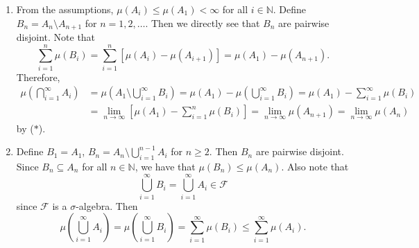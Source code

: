 \documentclass[12pt]{report}
\newcommand{\numl}[1]{\item[\large\textbf{\sffamily #1.}]}
\newcommand{\mc}[1]{\mathcal{#1}}
\newcommand{\bs}{\setminus}
\renewcommand{\subset}{\subseteq}
\newcommand{\paren}[1]{\left( #1 \right)}
\newcommand{\ra}{\rightarrow}
\newcommand{\mast}{\(\ast\)}
\newcommand{\N}{\mathbb{N}}
\begin{document}
\begin{enumerate}
    \numl{5} From the assumptions, \(\mu(A_i) \leq \mu(A_1) < \infty\) for all \(i \in \N\). Define \(B_n = A_n \bs A_{n+1}\) for \(n = 1, 2, \dots\). Then we directly see that \(B_n\) are pairwise disjoint. Note that
    \[ \tag{\mast}
        \sum_{i=1}^n \mu(B_i) = \sum_{i=1}^n \left[\mu(A_i) - \mu(A_{i+1})\right] = \mu(A_1) - \mu(A_{n+1}).
    \]
    Therefore,
    \[
        \begin{aligned}
            \mu\paren{\bigcap_{i=1}^\infty A_i} & = \mu\paren{A_1 \bs \bigcup_{i=1}^\infty B_i} = \mu(A_1) - \mu\paren{\bigcup_{i=1}^\infty B_i} = \mu(A_1) - \sum_{i=1}^\infty \mu(B_i) \\
                                                & =\lim_{n\ra\infty} \left[\mu(A_1) - \sum_{i=1}^n \mu(B_i)\right] = \lim_{n\ra \infty} \mu(A_{n+1}) = \lim_{n\ra \infty} \mu(A_{n})
        \end{aligned}
    \]
    by (\mast).

    \numl{6} Define \(B_1 = A_1\), \(B_n = A_n \bs \bigcup_{i=1}^{n-1} A_i\) for \(n \geq 2\). Then \(B_n\) are pairwise disjoint. Since \(B_n \subset A_n\) for all \(n \in \N\), we have that \(\mu(B_n) \leq \mu(A_n)\). Also note that
    \[
        \bigcup_{i=1}^\infty B_i = \bigcup_{i=1}^\infty A_i \in \mc{F}
    \]
    since \(\mc{F}\) is a \(\sigma\)-algebra. Then
    \[
        \mu\paren{\bigcup_{i=1}^\infty A_i} = \mu\paren{\bigcup_{i=1}^\infty B_i} = \sum_{i=1}^\infty \mu(B_i) \leq \sum_{i=1}^\infty \mu(A_i).
    \]
\end{enumerate}
\end{document}

